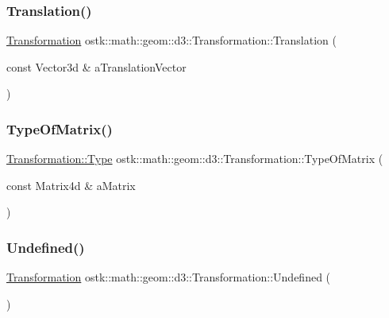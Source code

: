 \subsubsection{\texorpdfstring{Translation()}{Translation()}}
{\footnotesize\ttfamily \hyperlink{classostk_1_1math_1_1geom_1_1d3_1_1_transformation}{Transformation} ostk\+::math\+::geom\+::d3\+::\+Transformation\+::\+Translation (\begin{DoxyParamCaption}\item[{const Vector3d \&}]{a\+Translation\+Vector }\end{DoxyParamCaption})\hspace{0.3cm}{\ttfamily [static]}}

\mbox{\label{classostk_1_1math_1_1geom_1_1d3_1_1_transformation_aa66bff4c95399e4068ef38316658bf09}} 
\subsubsection{\texorpdfstring{Type\+Of\+Matrix()}{TypeOfMatrix()}}
{\footnotesize\ttfamily \hyperlink{classostk_1_1math_1_1geom_1_1d3_1_1_transformation_a04794da018108a1e973dad364c32b4ec}{Transformation\+::\+Type} ostk\+::math\+::geom\+::d3\+::\+Transformation\+::\+Type\+Of\+Matrix (\begin{DoxyParamCaption}\item[{const Matrix4d \&}]{a\+Matrix }\end{DoxyParamCaption})\hspace{0.3cm}{\ttfamily [static]}}

\mbox{\label{classostk_1_1math_1_1geom_1_1d3_1_1_transformation_afe6a425a70775b707f4627e714f19c1a}} 
\subsubsection{\texorpdfstring{Undefined()}{Undefined()}}
{\footnotesize\ttfamily \hyperlink{classostk_1_1math_1_1geom_1_1d3_1_1_transformation}{Transformation} ostk\+::math\+::geom\+::d3\+::\+Transformation\+::\+Undefined (\begin{DoxyParamCaption}{ }\end{DoxyParamCaption})\hspace{0.3cm}{\ttfamily [static]}}




